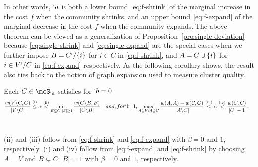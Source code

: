 In other words, $`a$ is both a lower bound~\eqref{eq:f-shrink} of the marginal increase in the cost
$f$ when the community shrinks, and an upper bound~\eqref{eq:f-expand} of the marginal decrease in
the cost $f$ when the community expands. The above theorem can be viewed as a generalization of
Proposition~\ref{pro:single-deviation} because \eqref{eq:single-shrink} and \eqref{eq:single-expand}
are the special cases when we further impose $B=C`/\{i\}$ for $i\in C$ in \eqref{eq:f-shrink}, and
$A=C\cup \{i\}$ for $i\in V`/C$ in \eqref{eq:f-expand} respectively. As the following corollary
shows, the result also ties back to the notion of graph expansion used to measure cluster quality.

\begin{corollary}
  Each $C\in \mcS_{`a}$ satisfies for $`b=0$
  \begin{subequations}
    \begin{align}
      \label{eq:bound-beta0}
      \frac{w(V\backslash C, C)}{|V\backslash C|} 
      &
        \stackrel{ \rm{(i)} }{\leq}
        \alpha
        \stackrel{ \rm{(ii)} }{<}
        \min_{B\subsetneq C: |B| \geq 1} \frac{w(C\backslash B, B)}{|C\backslash B|} 
    \end{align}
    and, for $`b=1$,
    \begin{align}
      \label{eq:bound-beta1}
      \max_{A\subseteq V: A\supsetneq C} \frac{w(A,A)-w(C,C)}{|A\backslash C|}  
      &
        \stackrel{ \rm{(iii)} }{\leq}
        \alpha
        \stackrel{ \rm{(iv)} }{<}
        \frac{w(C, C)}{|C|-1}. 
    \end{align}
  \end{subequations}
  ~\relax
\end{corollary}
\begin{Proof}
  (ii) and (iii) follow from \eqref{eq:f-shrink} and \eqref{eq:f-expand} with $\beta=0$ and $1$,
  respectively. (i) and (iv) follow from \eqref{eq:f-expand} and \eqref{eq:f-shrink} by choosing
	$A= V$ 
	and
	$B\subsetneq C:|B|=1$
	with $\beta = 0$ and $1$, respectively.
\end{Proof}


